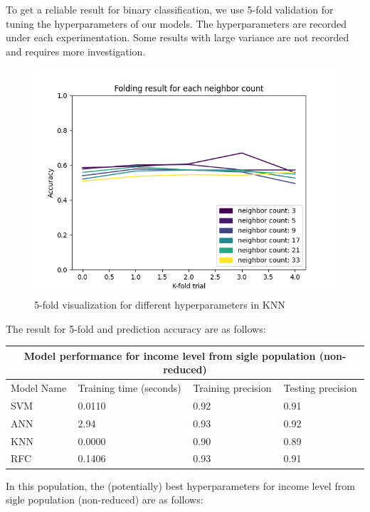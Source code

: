 To get a reliable result for binary classification, we use 5-fold validation for tuning the hyperparameters of our models. The hyperparameters are recorded under each experimentation. Some results with large variance are not recorded and requires more investigation.

\begin{figure}[h]
    \centering
    \includegraphics[width=\textwidth]{images/folding_count.png}
    \caption{5-fold visualization for different hyperparameters in KNN}
    \label{feature_fit}
    \end{figure}

The result for 5-fold and prediction accuracy are as follows:

\begin{table}[h!]
    \centering
\begin{tabular}{ |p{3cm}||p{5cm}|p{4cm}|p{4cm}|}
    \hline
    \multicolumn{4}{|c|}{Model performance for income level from sigle population (non-reduced)} \\
    \hline
    Model Name& Training time (seconds)& Training precision & Testing precision \\
    \hline
    SVM &0.0110    &0.92&0.91\\
    ANN &2.94  & 0.93  & 0.92\\
    KNN &0.0000 & 0.90&0.89\\
    RFC &0.1406 & 0.93&0.91\\
    \hline
   \end{tabular}
\end{table}

In this population, the (potentially) best hyperparameters for income level from sigle population (non-reduced) are as follows:

